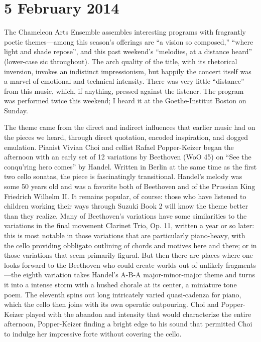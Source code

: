 \chapter{5 February 2014}

The Chameleon Arts Ensemble assembles interesting programs with fragrantly poetic themes—among this season’s offerings are “a vision so composed,” “where light and shade repose”, and this past weekend’s “melodies, at a distance heard” (lower-case sic throughout). The arch quality of the title, with its rhetorical inversion, invokes an indistinct impressionism, but happily the concert itself was a marvel of emotional and technical intensity. There was very little “distance” from this music, which, if anything, pressed against the listener. The program was performed twice this weekend; I heard it at the Goethe-Institut Boston on Sunday.

The theme came from the direct and indirect influences that earlier music had on the pieces we heard, through direct quotation, encoded inspiration, and dogged emulation. Pianist Vivian Choi and cellist Rafael Popper-Keizer began the afternoon with an early set of 12 variations by Beethoven (WoO 45) on “See the conqu’ring hero comes” by Handel. Written in Berlin at the same time as the first two cello sonatas, the piece is fascinatingly transitional. Handel’s melody was some 50 years old and was a favorite both of Beethoven and of the Prussian King Friedrich Wilhelm II. It remains popular, of course: those who have listened to children working their ways through Suzuki Book 2 will know the theme better than they realize. Many of Beethoven’s variations have some similarities to the variations in the final movement Clarinet Trio, Op. 11, written a year or so later: this is most notable in those variations that are particularly piano-heavy, with the cello providing obbligato outlining of chords and motives here and there; or in those variations that seem primarily figural. But then there are places where one looks forward to the Beethoven who could create worlds out of unlikely fragments—the eighth variation takes Handel’s A-B-A major-minor-major theme and turns it into a intense storm with a hushed chorale at its center, a miniature tone poem. The eleventh spins out long intricately varied quasi-cadenza for piano, which the cello then joins with its own operatic outpouring. Choi and Popper-Keizer played with the abandon and intensity that would characterize the entire afternoon, Popper-Keizer finding a bright edge to his sound that permitted Choi to indulge her impressive forte without covering the cello.

